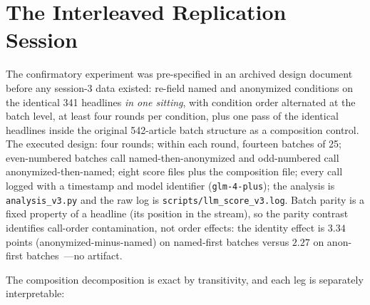 \section{The Interleaved Replication Session}\label{app:interleaved}

The confirmatory experiment was pre-specified in an archived design document before any session-3 data existed: re-field named and anonymized conditions on the identical 341 headlines \emph{in one sitting}, with condition order alternated at the batch level, at least four rounds per condition, plus one pass of the identical headlines inside the original 542-article batch structure as a composition control. The executed design: four rounds; within each round, fourteen batches of 25; even-numbered batches call named-then-anonymized and odd-numbered call anonymized-then-named; eight score files plus the composition file; every call logged with a timestamp and model identifier (\texttt{glm-4-plus}); the analysis is \texttt{analysis\_v3.py} and the raw log is \texttt{scripts/llm\_score\_v3.log}. Batch parity is a fixed property of a headline (its position in the stream), so the parity contrast identifies call-order contamination, not order effects: the identity effect is $3.34$ points (anonymized-minus-named) on named-first batches versus $2.27$ on anon-first batches~---no artifact.

The composition decomposition is exact by transitivity, and each leg is separately interpretable:


